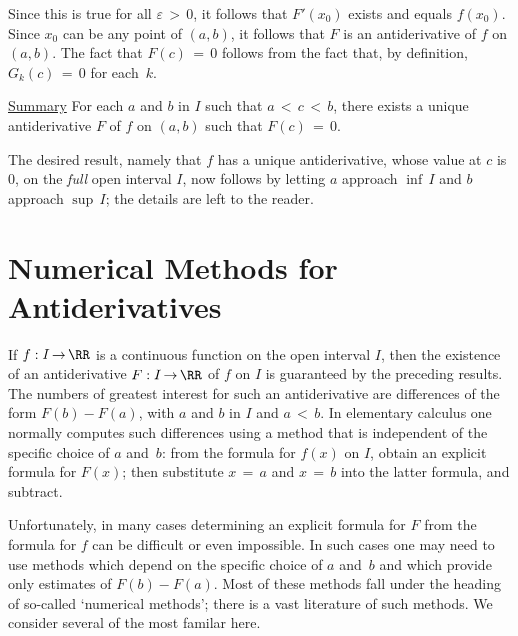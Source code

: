     Since this is true for all ${\varepsilon}\,>\,0$, it follows that $F'(x_{0})$ exists and equals $f(x_{0})$.
    Since $x_{0}$ can be any point of $(a,b)$, it follows that $F$ is an antiderivative of $f$ on $(a,b)$.
    The fact that $F(c) \,=\, 0$ follows from the fact that, by definition, $G_{k}(c) \,=\, 0$ for each~$k$.

\V

        \underline{Summary} For each $a$ and $b$ in $I$ such that $a\,<\,c\,<\,b$,
    there exists a unique antiderivative $F$ of $f$ on $(a,b)$ such that $F(c) \,=\, 0$.

        The desired result, namely that $f$ has a unique antiderivative, whose value at $c$ is $0$, on the {\em full} open interval $I$,
    now follows by letting $a$ approach ${\inf}\,I$ and $b$ approach ${\sup}\,I$; the details are left to the reader. \Q

\VV

                \section{{\bf Numerical Methods for Antiderivatives}} 
                \label{SectE45C}


\VV

        If $f:I \,{\rightarrow}\, {\RR}$ is a continuous function on the open interval $I$,
    then the existence of an antiderivative $F:I \,{\rightarrow}\, {\RR}$ of $f$ on $I$ is guaranteed by the preceding results.
    The numbers of greatest interest for such an antiderivative are differences of the form $F(b) - F(a)$, with $a$ and $b$ in $I$ and $a\,<\,b$.
    In elementary calculus one normally computes such differences using a method that is independent of the specific choice of $a$ and~$b$:
    from the formula for $f(x)$ on $I$, obtain an explicit formula for $F(x)$; then substitute $x \,=\, a$ and $x \,=\, b$ into the latter formula, and subtract.

        Unfortunately, in many cases determining an explicit formula for $F$ from the formula for $f$ can be difficult or even impossible.
    In such cases one may need to use methods which depend on the specific choice of $a$ and~$b$ and which provide only estimates of $F(b)-F(a)$.
    Most of these methods fall under the heading of so-called `numerical methods'; there is a vast literature of such methods.
    We consider several of the most familar here.

